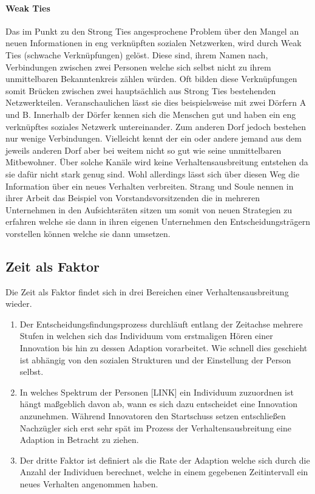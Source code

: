 \documentclass[12pt]{article}
\begin{document}
\paragraph{Weak Ties}
Das im Punkt zu den Strong Ties angesprochene Problem über den Mangel an neuen Informationen in eng verknüpften sozialen Netzwerken, wird durch Weak Ties (schwache Verknüpfungen) gelöst. Diese sind, ihrem Namen nach, Verbindungen zwischen zwei Personen welche sich selbst nicht zu ihrem unmittelbaren Bekanntenkreis zählen würden. Oft bilden diese Verknüpfungen somit Brücken zwischen zwei hauptsächlich aus Strong Ties bestehenden Netzwerkteilen. Veranschaulichen lässt sie dies beispielsweise mit zwei Dörfern A und B. Innerhalb der Dörfer kennen sich die Menschen gut und haben ein eng verknüpftes soziales Netzwerk untereinander. Zum anderen Dorf jedoch bestehen nur wenige Verbindungen. Vielleicht kennt der ein oder andere jemand aus dem jeweils anderen Dorf aber bei weitem nicht so gut wie seine unmittelbaren Mitbewohner. Über solche Kanäle wird keine Verhaltensausbreitung entstehen da sie dafür nicht stark genug sind. Wohl allerdings lässt sich über diesen Weg die Information über ein neues Verhalten verbreiten. Strang und Soule \cite{strang98} nennen in ihrer Arbeit das Beispiel von Vorstandsvorsitzenden die in mehreren Unternehmen in den Aufsichtsräten sitzen um somit von neuen Strategien zu erfahren welche sie dann in ihren eigenen Unternehmen den Entscheidungsträgern vorstellen können welche sie dann umsetzen.
\subsection{Zeit als Faktor}
Die Zeit als Faktor findet sich in drei Bereichen einer Verhaltensausbreitung wieder.
\begin{enumerate}
\item Der Entscheidungsfindungsprozess durchläuft entlang der Zeitachse mehrere Stufen in welchen sich das Individuum vom erstmaligen Hören einer Innovation bis hin zu dessen Adaption vorarbeitet. Wie schnell dies geschieht ist abhängig von den sozialen Strukturen und der Einstellung der Person selbst.
\item In welches Spektrum der Personen [LINK] ein Individuum zuzuordnen ist hängt maßgeblich davon ab, wann es sich dazu entscheidet eine Innovation anzunehmen. Während Innovatoren den Startschuss setzen entschließen Nachzügler sich erst sehr spät im Prozess der Verhaltensausbreitung eine Adaption in Betracht zu ziehen.
\item Der dritte Faktor ist definiert als die Rate der Adaption welche sich durch die Anzahl der Individuen berechnet, welche in einem gegebenen Zeitintervall ein neues Verhalten angenommen haben.
\end{enumerate}
\end{document}
